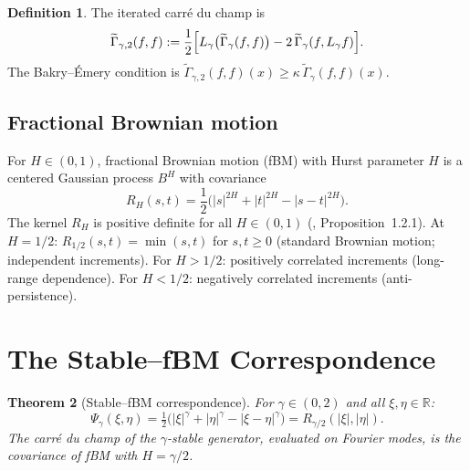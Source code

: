 \documentclass[11pt,a4paper]{article}
\theoremstyle{plain}
\newtheorem{theorem}{Theorem}[section]
\theoremstyle{definition}
\newtheorem{definition}[theorem]{Definition}
\theoremstyle{remark}
\newcommand{\R}{\mathbb{R}}
\begin{document}
\begin{definition}\label{def:gamma2}
The iterated carr\'e du champ is
\begin{equation}\label{eq:gamma2-def}
  \widetilde{\Gamma}_{\gamma,2}(f,f)
  := \frac{1}{2}\Bigl[
    L_\gamma\bigl(\widetilde{\Gamma}_\gamma(f,f)\bigr)
    - 2\,\widetilde{\Gamma}_\gamma(f, L_\gamma f)
  \Bigr].
\end{equation}
The Bakry--\'Emery condition is
$\widetilde{\Gamma}_{\gamma,2}(f,f)(x) \geq \kappa\,
\widetilde{\Gamma}_\gamma(f,f)(x)$.
\end{definition}


\subsection{Fractional Brownian motion}

For $H \in (0,1)$, fractional Brownian motion (fBM) with Hurst
parameter $H$ is a centered Gaussian process $B^H$ with covariance
\begin{equation}\label{eq:fbm-cov}
  R_H(s,t)
  = \frac{1}{2}\bigl(|s|^{2H} + |t|^{2H} - |s-t|^{2H}\bigr).
\end{equation}
The kernel $R_H$ is positive definite for all $H \in (0,1)$
(\cite{Mishura2008}, Proposition~1.2.1).
At $H = 1/2$: $R_{1/2}(s,t) = \min(s,t)$ for $s,t \geq 0$
(standard Brownian motion; independent increments).
For $H > 1/2$: positively correlated increments (long-range dependence).
For $H < 1/2$: negatively correlated increments (anti-persistence).


\section{The Stable--fBM Correspondence}\label{sec:duality}

\begin{theorem}[Stable--fBM correspondence]\label{thm:duality}
For $\gamma \in (0,2)$ and all $\xi, \eta \in \R$:
\begin{equation}\label{eq:duality}
  \Psi_\gamma(\xi,\eta)
  = \tfrac{1}{2}\bigl(|\xi|^\gamma + |\eta|^\gamma
  - |\xi - \eta|^\gamma\bigr)
  = R_{\gamma/2}(|\xi|, |\eta|).
\end{equation}
The carr\'e du champ of the $\gamma$-stable generator, evaluated
on Fourier modes, is the covariance of fBM with $H = \gamma/2$.
\end{theorem}
\end{document}

